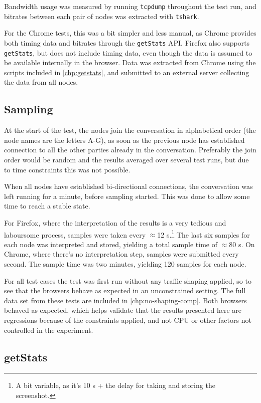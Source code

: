 Bandwidth usage was measured by running \texttt{tcpdump} throughout the test run, and bitrates between each pair of nodes was extracted with \texttt{tshark}.

For the Chrome tests, this was a bit simpler and less manual, as Chrome provides both timing data and bitrates through the \texttt{getStats} API. Firefox also supports \texttt{getStats}, but does not include timing data, even though the data is assumed to be available internally in the browser. Data was extracted from Chrome using the scripts included in \autoref{chp:getstats}, and submitted to an external server collecting the data from all nodes.


\subsection{Sampling}

At the start of the test, the nodes join the conversation in alphabetical order (the node names are the letters A-G), as soon as the previous node has established connection to all the other parties already in the conversation. Preferably the join order would be random and the results averaged over several test runs, but due to time constraints this was not possible.

When all nodes have established bi-directional connections, the conversation was left running for a minute, before sampling started. This was done to allow some time to reach a stable state.

For Firefox, where the interpretation of the results is a very tedious and laboursome process, samples were taken every $\approx$12 s.\footnote{A bit variable, as it's 10 s + the delay for taking and storing the screenshot.} The last six samples for each node was interpreted and stored, yielding a total sample time of $\approx$80 s. On Chrome, where there's no interpretation step, samples were submitted every second. The sample time was two minutes, yielding 120 samples for each node.

For all test cases the test was first run without any traffic shaping applied, so to see that the browsers behave as expected in an unconstrained setting. The full data set from these tests are included in \autoref{chp:no-shaping-comp}. Both browsers behaved as expected, which helps validate that the results presented here are regressions because of the constraints applied, and not CPU or other factors not controlled in the experiment.


\subsection{getStats}

